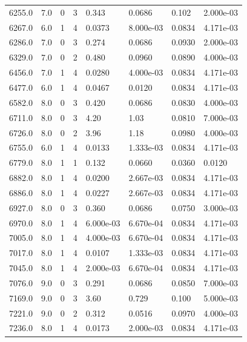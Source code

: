 \documentclass[preview]{standalone}
\begin{document}
{{{{\begin{tabular}{L{1.2cm}C{1.2cm} C{0.3cm}C{0.5cm} C{1.4cm}C{1.4cm} C{1.4cm}C{1.4cm}}
  6255.0  &   7.0  & 0     &  3 &  0.343  & 0.0686  & 0.102 &  2.000e-03   \\ 
  6267.0  &   6.0  & 1     &  4 &  0.0373  & 8.000e-03  & 0.0834 &  4.171e-03   \\ 
  6286.0  &   7.0  & 0     &  3 &  0.274  & 0.0686  & 0.0930 &  2.000e-03   \\ 
  6329.0  &   7.0  & 0     &  2 &  0.480  & 0.0960  & 0.0890 &  4.000e-03   \\ 
  6456.0  &   7.0  & 1     &  4 &  0.0280  & 4.000e-03  & 0.0834 &  4.171e-03   \\ 
  6477.0  &   6.0  & 1     &  4 &  0.0467  & 0.0120  & 0.0834 &  4.171e-03   \\ 
  6582.0  &   8.0  & 0     &  3 &  0.420  & 0.0686  & 0.0830 &  4.000e-03   \\ 
  6711.0  &   8.0  & 0     &  3 &  4.20  & 1.03  & 0.0810 &  7.000e-03   \\ 
  6726.0  &   8.0  & 0     &  2 &  3.96  & 1.18  & 0.0980 &  4.000e-03   \\ 
  6755.0  &   6.0  & 1     &  4 &  0.0133  & 1.333e-03  & 0.0834 &  4.171e-03   \\ 
  6779.0  &   8.0  & 1     &  1 &  0.132  & 0.0660  & 0.0360 &  0.0120   \\ 
  6882.0  &   8.0  & 1     &  4 &  0.0200  & 2.667e-03  & 0.0834 &  4.171e-03   \\ 
  6886.0  &   8.0  & 1     &  4 &  0.0227  & 2.667e-03  & 0.0834 &  4.171e-03   \\ 
  6927.0  &   8.0  & 0     &  3 &  0.360  & 0.0686  & 0.0750 &  3.000e-03   \\ 
  6970.0  &   8.0  & 1     &  4 &  6.000e-03  & 6.670e-04  & 0.0834 &  4.171e-03   \\ 
  7005.0  &   8.0  & 1     &  4 &  4.000e-03  & 6.670e-04  & 0.0834 &  4.171e-03   \\ 
  7017.0  &   8.0  & 1     &  4 &  0.0107  & 1.333e-03  & 0.0834 &  4.171e-03   \\ 
  7045.0  &   8.0  & 1     &  4 &  2.000e-03  & 6.670e-04  & 0.0834 &  4.171e-03   \\ 
  7076.0  &   9.0  & 0     &  3 &  0.291  & 0.0686  & 0.0850 &  7.000e-03   \\ 
  7169.0  &   9.0  & 0     &  3 &  3.60  & 0.729  & 0.100 &  5.000e-03   \\ 
  7221.0  &   9.0  & 0     &  2 &  0.312  & 0.0516  & 0.0970 &  4.000e-03   \\ 
  7236.0  &   8.0  & 1     &  4 &  0.0173  & 2.000e-03  & 0.0834 &  4.171e-03   \\ 

\end{tabular}}}}}
\end{document}
